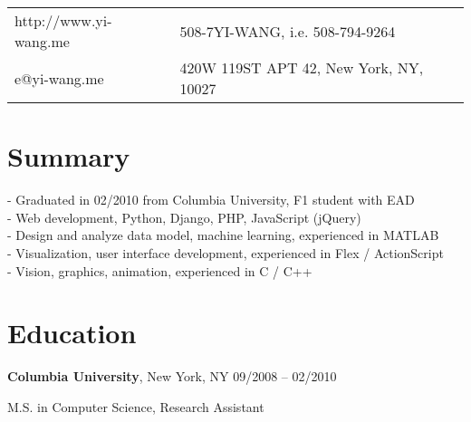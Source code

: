 \documentclass[margin,line]{resume}
\begin{document}
\begin{resume}

      \begin{tabular}{@{}p{6cm}p{8.5cm}}
      http://www.yi-wang.me  &  508-7YI-WANG, i.e. 508-794-9264           \\
      e@yi-wang.me             &  420W 119ST APT 42, New York, NY, 10027 \\
      \end{tabular}

 
    \section{\mysidestyle Summary}
      
      - Graduated in 02/2010 from Columbia University, F1 student with EAD \\
      - Web development, Python, Django, PHP, JavaScript (jQuery) \\
      - Design and analyze data model, machine learning, experienced in MATLAB \\
      - Visualization, user interface development, experienced in Flex / ActionScript \\
      - Vision, graphics, animation, experienced in C / C++
      

    \section{\mysidestyle Education}

    \textbf{Columbia University}, New York, NY \hfill 09/2008 -- 02/2010 \vspace{-3mm}\\\vspace{-1mm}%
      \begin{list2}
       \item M.S. in Computer Science, Research Assistant
      \end{list2}
 


\end{resume}
\end{document}
